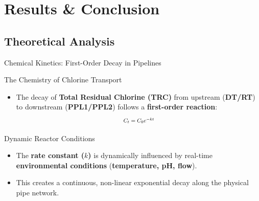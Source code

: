 \documentclass[xcolor=dvipsnames]{beamer}
\begin{document}
\section{Results \& Conclusion}

\subsection{Theoretical Analysis}
\begin{frame}{Chemical Kinetics: First-Order Decay in Pipelines}
  \footnotesize
  \begin{block}{The Chemistry of Chlorine Transport}
      \begin{itemize}
          \item The decay of \textbf{Total Residual Chlorine (TRC)} from upstream (\textbf{DT/RT}) to downstream (\textbf{PPL1/PPL2}) follows a \textbf{first-order reaction}:
          \begin{equation*}
              \scalebox{0.8}{$C_t = C_0 e^{-kt}$}
          \end{equation*}
      \end{itemize}
  \end{block}
  \begin{block}{Dynamic Reactor Conditions}
      \begin{itemize}
          \item The \textbf{rate constant ($k$)} is dynamically influenced by real-time \textbf{environmental conditions} (\textbf{temperature, pH, flow}).
          \item This creates a continuous, non-linear exponential decay along the physical pipe network.
      \end{itemize}
  \end{block}
\end{frame}
\end{document}
